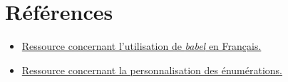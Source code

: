 \section{Références}

\begin{itemize}
    \item \href{http://lesfichesabebert.fr/latex/Français.html}{Ressource concernant l'utilisation de \textit{babel} en Français.}
    \item \href{http://lesfichesabebert.fr/latex/Listes.html}{Ressource concernant la personnalisation des énumérations.}
\end{itemize}
